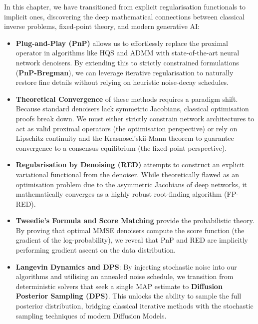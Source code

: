 In this chapter, we have transitioned from explicit regularisation functionals to implicit ones, discovering the deep mathematical connections between classical inverse problems, fixed-point theory, and modern generative AI:
\begin{itemize}
    \item \textbf{Plug-and-Play (PnP)} allows us to effortlessly replace the proximal operator in algorithms like HQS and ADMM with state-of-the-art neural network denoisers. By extending this to strictly constrained formulations (\textbf{PnP-Bregman}), we can leverage iterative regularisation to naturally restore fine details without relying on heuristic noise-decay schedules.
    \item \textbf{Theoretical Convergence} of these methods requires a paradigm shift. Because standard denoisers lack symmetric Jacobians, classical optimisation proofs break down. We must either strictly constrain network architectures to act as valid proximal operators (the optimisation perspective) or rely on Lipschitz continuity and the Krasnosel'skii-Mann theorem to guarantee convergence to a consensus equilibrium (the fixed-point perspective).
    \item \textbf{Regularisation by Denoising (RED)} attempts to construct an explicit variational functional from the denoiser. While theoretically flawed as an optimisation problem due to the asymmetric Jacobians of deep networks, it mathematically converges as a highly robust root-finding algorithm (FP-RED).
    \item \textbf{Tweedie's Formula and Score Matching} provide the probabilistic theory. By proving that optimal MMSE denoisers compute the score function (the gradient of the log-probability), we reveal that PnP and RED are implicitly performing gradient ascent on the data distribution. 
    \item \textbf{Langevin Dynamics and DPS}: By injecting stochastic noise into our algorithms and utilising an annealed noise schedule, we transition from deterministic solvers that seek a single MAP estimate to \textbf{Diffusion Posterior Sampling (DPS)}. This unlocks the ability to sample the full posterior distribution, bridging classical iterative methods with the stochastic sampling techniques of modern Diffusion Models.
\end{itemize}